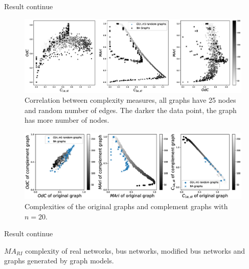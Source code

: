 \documentclass{beamer}
\begin{document}
    \begin{frame}{Result continue}
        \vspace{-5mm}
            \begin{figure}
                \includegraphics[width=\textwidth,height=0.5\textheight,keepaspectratio]{complexity_correlation.eps}
                \vspace{-10mm}
                \caption{Correlation between complexity measures, all graphs have 25 nodes and random number of edges. The darker the data point, the graph has more number of nodes.}
            \end{figure}
            \vspace{-15mm}
            \begin{figure}
                \includegraphics[width=\textwidth,height=0.5\textheight,keepaspectratio]{complement.eps}
                \caption{ Complexities of the original graphs and complement graphs with $n = 20$.}
            \end{figure}
    \end{frame}

    \begin{frame}{Result continue}
        
        \centering
        $MA_{RI}$ complexity of real networks, bus networks, modified bus networks and graphs generated by graph models.
    \end{frame}
\end{document}
